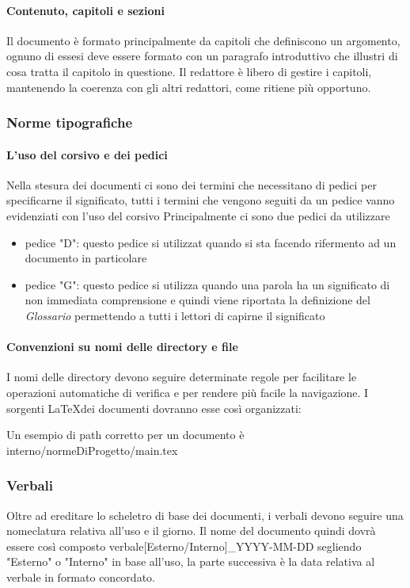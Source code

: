   \paragraph{Contenuto, capitoli e sezioni}
  Il documento è formato principalmente da capitoli che definiscono un argomento,
  ognuno di essesi deve essere formato con un paragrafo introduttivo che illustri
  di cosa tratta il capitolo in questione.
  Il redattore è libero di gestire i capitoli, mantenendo la coerenza con gli altri
  redattori, come ritiene più opportuno.
  \subsubsection{Norme tipografiche}
  \paragraph{L'uso del corsivo e dei pedici}
  Nella stesura dei documenti ci sono dei termini che necessitano di pedici per
  specificarne il significato, tutti i termini che vengono seguiti da un pedice
  vanno evidenziati con l'uso del corsivo
  Principalmente ci sono due pedici da utilizzare
    \begin{itemize}
      \item pedice "D": questo pedice si utilizzat quando si sta facendo rifermento
      ad un documento in particolare
      \item pedice "G": questo pedice si utilizza quando una parola ha un significato
      di non immediata comprensione e quindi viene riportata la definizione del
      \textit{Glossario}\doc
      permettendo a tutti i lettori di capirne il significato
    \end{itemize}

  \paragraph{Convenzioni su nomi delle directory e file}
  I nomi delle directory devono seguire determinate regole per facilitare le operazioni
  automatiche di verifica e per rendere più facile la navigazione.
  I sorgenti \LaTeX \space dei documenti dovranno esse così organizzati:


  Un esempio di path corretto per un documento è interno/normeDiProgetto/main.tex
  \subsubsection{Verbali}
  Oltre ad ereditare lo scheletro di base dei documenti, i verbali devono seguire
  una nomeclatura relativa all'uso e il giorno.
  Il nome del documento quindi dovrà essere così composto
  verbale[Esterno/Interno]\_YYYY-MM-DD segliendo "Esterno" o "Interno" in base
  all'uso, la parte successiva è la data relativa al verbale in formato concordato.

